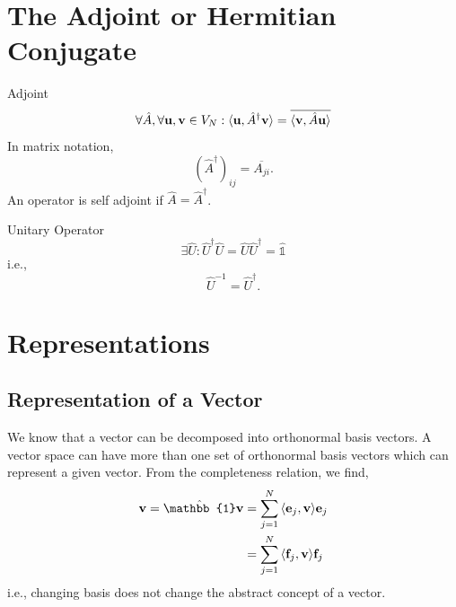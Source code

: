 \documentclass{book}
\def\innerproduct#1#2{{\langle #1},{#2 \rangle}}
\begin{document}
\section{The Adjoint or Hermitian Conjugate}
\begin{Definitions}{Adjoint}{}
	\begin{equation}
	\forall \hat{A}, \forall \vb{u},\vb{v} \in V_N : \innerproduct{\vb{u}}{\hat{A}^{\dag}\vb{v}} = \overline{\innerproduct{\vb{v}}{\hat{A}\vb{u}}}
\end{equation}
In matrix notation,
\begin{equation}
	(\hat{A}^{\dag})_{ij} = \overline{A_{ji}}.
\end{equation}
An operator is self adjoint if $\hat{A} = \hat{A}^{\dag}$.
\end{Definitions}
\begin{Definitions}{Unitary Operator}{}
	\begin{equation}
		\exists \hat{U} : \hat{U}^{\dag}\hat{U} = \hat{U}\hat{U}^{\dag} = \hat{\mathbb{1}}
	\end{equation}
	i.e.,
	\begin{equation}
		\hat{U}^{-1} = \hat{U}^{\dag}.
	\end{equation}
\end{Definitions}

\section{Representations}
\subsection{Representation of a Vector}
We know that a vector can be decomposed into orthonormal basis vectors. A vector space can have more than one set of orthonormal basis vectors which can represent a given vector. From the completeness relation, we find,
\begin{equation}
	\begin{split}
		\vb{v} = \hat{\mathbb{1}}\vb{v} &= \sum_{j=1}^N \innerproduct{\vb{e}_j}{\vb{v}}\vb{e}_j \\ 
		& = \sum_{j=1}^N\innerproduct{\vb{f}_j}{\vb{v}}\vb{f}_j
	\end{split}
\end{equation}
i.e., changing basis does not change the abstract concept of a vector.
\end{document}
